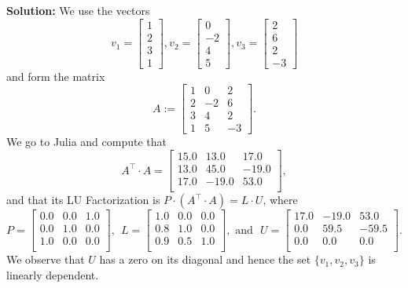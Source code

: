 \textbf{Solution:} We use the vectors $$v_1 = \left[ \begin{array}{r} 1 \\2\\  3 \\1  \end{array} \right]  , v_2 = \left[ \begin{array}{r}  0 \\ -2  \\4 \\ 5  \end{array} \right], v_3 = \left[ \begin{array}{r} 2 \\ 6 \\ 2  \\ -3 \end{array} \right] $$
and form the matrix
$$A:= \left[ \begin{array}{rrr} 1  & 0 & 2\\2 & -2 & 6\\  3 & 4 & 2 \\1 & 5 & -3  \end{array} \right]. $$
We go to Julia and compute that
$$ A^\top \cdot A =
\left[
\begin{array}{rrr}
15.0 & 13.0 & 17.0 \\
13.0 & 45.0 & -19.0 \\
17.0 & -19.0 & 53.0 \\
\end{array}
\right],
$$
and that its LU Factorization is $P\cdot \left( A^\top \cdot A \right) = L \cdot U$, where
$$P = \left[
\begin{array}{ccc}
0.0 & 0.0 & 1.0 \\
0.0 & 1.0 & 0.0 \\
1.0 & 0.0 & 0.0 \\
\end{array}
\right],~~ L=
\left[
\begin{array}{ccc}
1.0 & 0.0 & 0.0 \\
0.8 & 1.0 & 0.0 \\
0.9 & 0.5 & 1.0 \\
\end{array}
\right],
\text{ and ~} U=\left[
\begin{array}{rrr}
17.0 & -19.0 & 53.0 \\
0.0 & 59.5 & -59.5 \\
0.0 & 0.0 & \boxed{0.0} \\
\end{array}
\right]. $$
We observe that $U$ has a zero on its diagonal and hence the set $\{v_1, v_2, v_3 \}$ is linearly dependent.
\Qed\\

